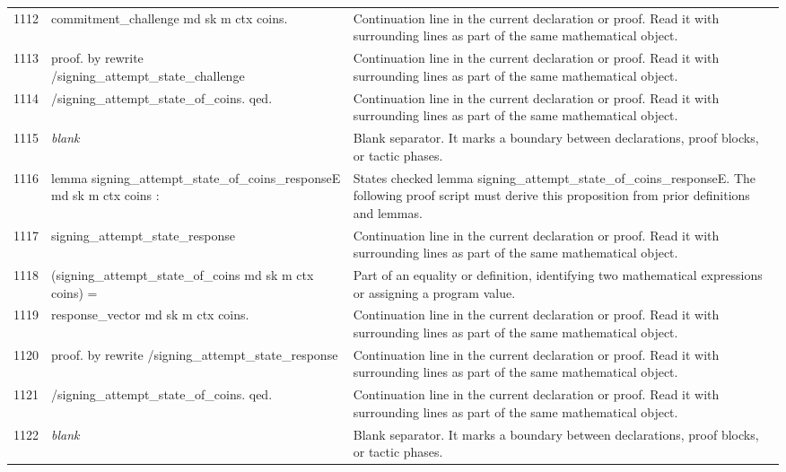 \documentclass[10pt]{article}
\begin{document}
\begin{longtable}{r L{0.53\textwidth} L{0.37\textwidth}}
1112 & {\ttfamily\scriptsize   commitment\_challenge md sk m ctx coins.} & Continuation line in the current declaration or proof.  Read it with surrounding lines as part of the same mathematical object. \\
1113 & {\ttfamily\scriptsize proof. by rewrite /signing\_attempt\_state\_challenge} & Continuation line in the current declaration or proof.  Read it with surrounding lines as part of the same mathematical object. \\
1114 & {\ttfamily\scriptsize                   /signing\_attempt\_state\_of\_coins. qed.} & Continuation line in the current declaration or proof.  Read it with surrounding lines as part of the same mathematical object. \\
1115 & {\ttfamily\scriptsize \emph{blank}} & Blank separator.  It marks a boundary between declarations, proof blocks, or tactic phases. \\
1116 & {\ttfamily\scriptsize lemma signing\_attempt\_state\_of\_coins\_responseE md sk m ctx coins :} & States checked lemma signing\_attempt\_state\_of\_coins\_responseE.  The following proof script must derive this proposition from prior definitions and lemmas. \\
1117 & {\ttfamily\scriptsize   signing\_attempt\_state\_response} & Continuation line in the current declaration or proof.  Read it with surrounding lines as part of the same mathematical object. \\
1118 & {\ttfamily\scriptsize     (signing\_attempt\_state\_of\_coins md sk m ctx coins) =} & Part of an equality or definition, identifying two mathematical expressions or assigning a program value. \\
1119 & {\ttfamily\scriptsize   response\_vector md sk m ctx coins.} & Continuation line in the current declaration or proof.  Read it with surrounding lines as part of the same mathematical object. \\
1120 & {\ttfamily\scriptsize proof. by rewrite /signing\_attempt\_state\_response} & Continuation line in the current declaration or proof.  Read it with surrounding lines as part of the same mathematical object. \\
1121 & {\ttfamily\scriptsize                   /signing\_attempt\_state\_of\_coins. qed.} & Continuation line in the current declaration or proof.  Read it with surrounding lines as part of the same mathematical object. \\
1122 & {\ttfamily\scriptsize \emph{blank}} & Blank separator.  It marks a boundary between declarations, proof blocks, or tactic phases. \\

\end{longtable}
\end{document}
